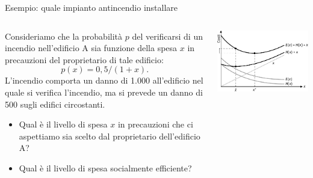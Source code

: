 \documentclass[aspectratio=64,11pt]{beamer}
\begin{document}
\begin{frame}{Esempio: quale impianto antincendio installare}
\begin{columns}
\begin{column}{.5\columnwidth}
Consideriamo che la probabilità $p$ del verificarsi di un incendio nell'edificio A sia funzione
della spesa $x$ in precauzioni del proprietario di tale edificio:
$$p(x) = 0,5/(1 + x).$$
L’incendio comporta un danno di 1.000 all'edificio
nel quale si verifica l'incendio, ma si prevede un danno di 500 sugli
edifici circostanti.
\begin{itemize}
\item Qual è il livello di spesa $x$ in precauzioni che ci aspettiamo sia scelto
dal proprietario dell'edificio A?
\item Qual è il livello di spesa socialmente efficiente?
\end{itemize}
\end{column}
\begin{column}{.5\columnwidth}
\begin{center}
\includegraphics[width=\textwidth]{./figure/esternalita-precauzioni.pdf}
\end{center}
\end{column}
\end{columns}
\end{frame}
\end{document}
